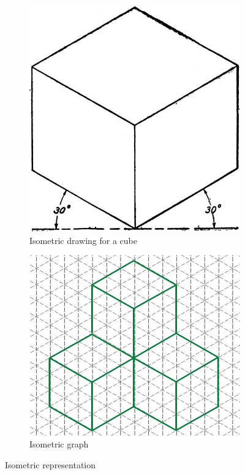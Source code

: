\documentclass[a4paper,11pt,openany]{book}
\begin{document}
\begin{figure}[h]
 \centering
\begin{subfigure}{0.4\textwidth}
\includegraphics[scale=0.2]{isometric2} 
\caption{Isometric drawing for a cube}
\label{fig:subim1}
\end{subfigure}
\begin{subfigure}{0.4\textwidth}
\includegraphics[scale=0.23]{isometric}
\caption{Isometric graph}
\label{fig:subim2}
\end{subfigure}
 
\caption{Isometric representation}
\label{fig:image2}
\end{figure}
\end{document}
